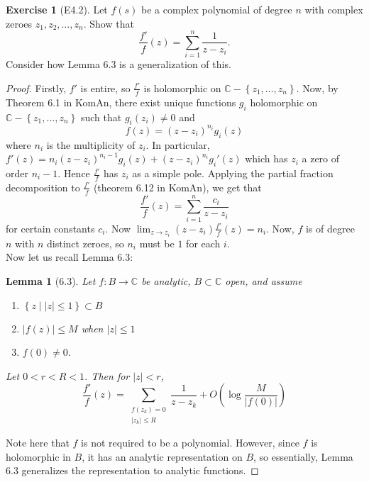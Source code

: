 \documentclass[reqno]{amsart}
\newtheorem{lemma}[theorem]{Lemma}
\theoremstyle{definition}
\newtheorem{exercise}[theorem]{Exercise}
\theoremstyle{remark}
\begin{document}
\begin{exercise}[E4.2]
    Let $f(s)$ be a complex polynomial of degree $n$ with
    complex zeroes $z_1, z_2, \ldots, z_n$. Show that
    \[
    \frac{f'}{f}(z) = \sum_{i=1}^{n} \frac{1}{z- z_i}.
    \] 
    Consider how Lemma 6.3 is a generalization of this.
\end{exercise}

\begin{proof}
    Firstly, $f'$ is entire, so
    $\frac{f'}{f}$ is holomorphic on 
    $\mathbb{C} - \left\{ z_1, \ldots, z_n \right\} $.
    Now, by Theorem 6.1 in KomAn, there
    exist unique functions
    $g_i$ holomorphic on
    $\mathbb{C} - \left\{ z_1,\ldots,z_n \right\} $ such that
    $g_i(z_i) \neq 0$ and
     \[
     f(z) = \left( z-z_i \right)^{n_i} g_i(z)
     \] 
     where $n_i$ is the multiplicity of $z_i$.
     In particular,
     $f'(z) = 
     n_i (z-z_i)^{n_i-1}g_i(z) + (z-z_i)^{n_i} g_i'(z)$ which
     has $z_i$ a zero of order
     $n_i -1$. Hence
     $\frac{f'}{f}$ has $z_i$ as a simple pole.
     Applying the partial fraction decomposition
     to $\frac{f'}{f}$ (theorem 6.12 in KomAn), we get
     that
     \[
     \frac{f'}{f}(z) = 
     \sum_{i=1}^{n} \frac{c_i}{z- z_i}
     \] 
     for certain constants $c_i$.
     Now $\lim_{z \to z_i}  (z-z_i) \frac{f'}{f}(z)
     = n_i$. 
     Now, $f$ is of degree $n$ with $n$ distinct zeroes, so
     $n_i$ must be $1$ for each $i$.\\
     
     Now let us recall Lemma 6.3:
     \begin{lemma}[6.3]
         Let $f \colon B \to \mathbb{C}$ be analytic,
         $B \subset \mathbb{C}$ open, and assume
         \begin{enumerate}
             \item $\left\{ z  \mid \left| z \right| \le 1
                 \right\} \subset B$ 
             \item $\left| f(z) \right| \le M$ when 
                 $\left| z \right| \le 1$ 
             \item $f(0) \neq 0$.
         \end{enumerate}
         Let $0 < r < R < 1$. Then for
         $\left| z \right| < r$,
         \[
         \frac{f'}{f}(z) = 
         \sum_{\substack{f(z_k) = 0 \\ \left| z_k \right| \le R}} 
         \frac{1}{z-z_k} + 
         O \left( \log \frac{M}{\left| f(0) \right| } \right) 
         \] 
     \end{lemma}

         Note here that $f$ is not required to be
         a polynomial. However, since $f$ is holomorphic
         in $B$, it has an analytic representation on $B$, so
         essentially, Lemma 6.3 generalizes the
         representation to analytic functions. 
\end{proof}
\end{document}
